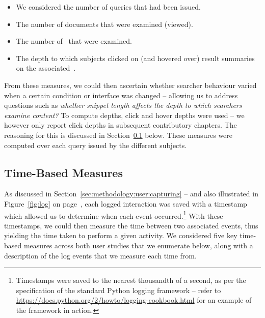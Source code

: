 \begin{itemize}
    \item{ We considered the number of queries that had been issued.}
    \item{ The number of documents that were examined (viewed).}
    \item{ The number of~ that were examined.}
    \item{ The depth to which subjects clicked on (and hovered over) result summaries on the associated~.}
\end{itemize}

From these measures, we could then ascertain whether searcher behaviour varied when a certain condition or interface was changed -- allowing us to address questions such as \emph{whether snippet length affects the depth to which searchers examine content?} To compute depths, click and hover depths were used -- we however only report click depths in subsequent contributory chapters. The reasoning for this is discussed in Section~\ref{sec:methodology:extracting:time} below. These measures were computed over each query issued by the different subjects.


\subsection{Time-Based Measures}\label{sec:methodology:extracting:time}
As discussed in Section~\ref{sec:methodology:user:capturing} -- and also illustrated in Figure~\ref{fig:log} on page~\pageref{fig:log}, each logged interaction was saved with a timestamp which allowed us to determine when each event occurred.\footnote{Timestamps were saved to the nearest thousandth of a second, as per the specification of the standard Python logging framework -- refer to \url{https://docs.python.org/2/howto/logging-cookbook.html}  for an example of the framework in action.} With these timestamps, we could then measure the time between two associated events, thus yielding the time taken to perform a given activity. We considered five key time-based measures across both user studies that we enumerate below, along with a description of the log events that we measure each time from.

